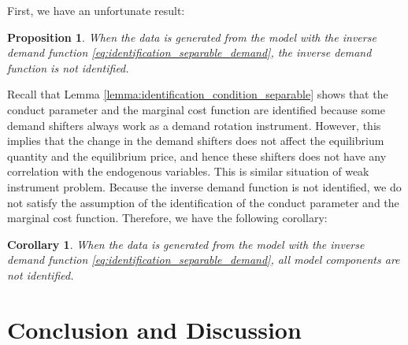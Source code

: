 \documentclass[11pt, a4paper]{article}
\newtheorem{proposition}{Proposition}
\newtheorem{corollary}{Corollary}
\theoremstyle{remark}
\newcommand{\appendixsection}{%
  \setcounter{section}{0}%
  \renewcommand{\thesection}{\Alph{section}}%
  \renewcommand{\thetheorem}{\Alph{section}.\arabic{theorem}}%
  \renewcommand{\thelemma}{\Alph{section}.\arabic{lemma}}%
  \renewcommand{\theproposition}{\Alph{section}.\arabic{proposition}}%
  \renewcommand{\thecorollary}{\Alph{section}.\arabic{corollary}}%
  \renewcommand{\thedefinition}{\Alph{section}.\arabic{definition}}%
}
\begin{document}
First, we have an unfortunate result:
\begin{proposition}
    When the data is generated from the model with the inverse demand function \eqref{eq:identification_separable_demand}, the inverse demand function is not identified.
\end{proposition}
Recall that Lemma \ref{lemma:identification_condition_separable} shows that the conduct parameter and the marginal cost function are identified because some demand shifters always work as a demand rotation instrument.
However, this implies that the change in the demand shifters does not affect the equilibrium quantity and the equilibrium price, and hence these shifters does not have any correlation with the endogenous variables.
This is similar situation of weak instrument problem.
Because the inverse demand function is not identified, we do not satisfy the assumption of the identification of the conduct parameter and the marginal cost function.
Therefore, we have the following corollary:
\begin{corollary}\label{corollary:nonidentification_model}
    When the data is generated from the model with the inverse demand function \eqref{eq:identification_separable_demand}, all model components are not identified.
\end{corollary}





\section{Conclusion and Discussion}






\newpage
\appendix
\appendixsection
{}
\end{document}
